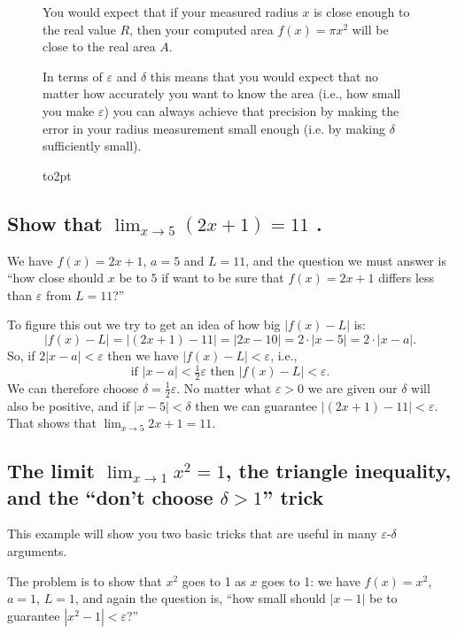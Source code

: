 \begin{figure}[t]
{\begin{minipage}{0.95\textwidth}
\begin{multicols}{2}
      You would expect that if your measured radius $x$ is close enough
      to the real value $R$, then your computed area $f(x) = \pi x^2$
      will be close to the real area $A$.

      In terms of $\varepsilon$ and $\delta$ this means that you would
      expect that no matter how accurately you want to know the area
      (i.e., how small you make $\varepsilon$) you can always achieve
      that precision by making the error in your radius measurement
      small enough (i.e.  by making $\delta$ sufficiently small).
    \end{multicols}
    \vbox to2pt{}
  \end{minipage} }
\end{figure}

\subsection{Show that $\lim_{x\to 5}(2x+1)=11$ . } 
We have $f(x) = 2x+1$, $a=5$ and $L=11$, and the question we must answer is
``how close should $x$ be to $5$ if want to be sure that $f(x)=2x+1$
differs less than $\varepsilon$ from $L=11$?''

To figure this out we try to get an idea of how big $|f(x)-L|$ is:
\[
|f(x)-L| = \bigl|(2x+1)-11\bigr| = |2x-10| = 2\cdot |x-5| = 2\cdot |x-a|.
\]
So, if $2|x-a|<\varepsilon$ then we have $|f(x)-L|<\varepsilon$, i.e.,
\[
\text{if }|x-a|<\tfrac12\varepsilon \text{ then } |f(x)-L|<\varepsilon.
\]
We can therefore choose $\delta = \frac12\varepsilon$.  No matter what
$\varepsilon>0$ we are given our $\delta$ will also be positive, and if
$|x-5|<\delta$ then we can guarantee $|(2x+1) - 11|<\varepsilon$.  That
shows that $\lim_{x\to 5}2x+1 = 11$.




\subsection{The limit $\lim_{x\to 1}x^2 = 1$, the triangle inequality, and the ``don't choose $\delta>1$'' trick} 
This example will show you two basic tricks that are useful in many
$\varepsilon$-$\delta$ arguments.

The problem is to show that $x^2$ goes to 1 as $x$ goes to 1: we have $f(x) =
x^2$, $a=1$, $L=1$, and again the question is, ``how small should $|x-1|$ be to
guarantee $|x^2-1|<\varepsilon$?''

